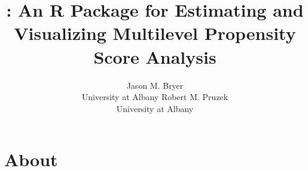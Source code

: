 \documentclass[article]{jss}
\author{Jason M. Bryer\\University at Albany \And 
        Robert M. Pruzek\\University at Albany}
\title{\pkg{multilevelPSA}: An R Package for Estimating and Visualizing Multilevel Propensity Score Analysis}
\begin{document}

\section[About Java]{About }
\end{document}
